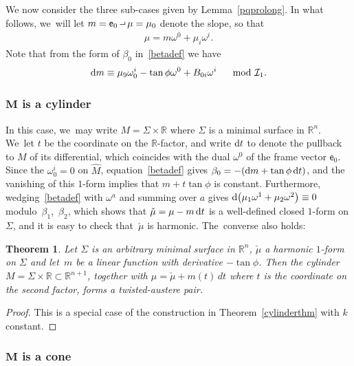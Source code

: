 \documentclass[pdftex]{sigma}
\def\R{\mathbb{R}}
\def\ve{\mathsf{e}}
\def\mudown{\check{\mu}}
\def\I{\mathcal{I}}
\def\w{\omega}
\def\Mhat{\widehat{M}}
\newcommand{\intprod}{\mathbin{\raisebox{.4ex}{\hbox{\vrule height .5pt width 5pt depth 0pt \vrule height 3pt width .5pt depth 0pt}}}}
\newtheorem{Theorem}{Theorem}[section]
\numberwithin{equation}{section}
\begin{document}
We now consider the three sub-cases given by Lemma~\ref{pqprolong}. In what follows, we~will let $m = \ve_0 \intprod \mu = \mu_0$ denote the slope, so that
\begin{gather*}
\mu = m \w^0 + \mu_i \w^i.
\end{gather*}
Note that from the form of $\beta_0$ in~\eqref{betadef} we have
\begin{gather*}
{\rm d}m \equiv \mu_9 \w^i_0 - \tan \phi \w^0 + B_{0i} \w^i \quad \mod \I_1.
\end{gather*}

\subsubsection[M is a cylinder]
{$\boldsymbol M$ is a cylinder} \label{splitcylindersec}

In this case, we~may write $M = \Sigma \times \R$ where $\Sigma$ is a minimal surface in $\R^n$. We~let $t$ be the coordinate on the $\R$-factor, and write ${\rm d}t$ to denote the pullback to $M$ of its differential, which coincides with the dual $\w^0$ of the frame vector $\ve_0$. Since the $\w^i_0=0$ on $\Mhat$, equation~\eqref{betadef} gives $\beta_0 = -({\rm d}m + \tan \phi\, {\rm d}t)$, and the vanishing of this $1$-form implies that $m+t \tan \phi $ is constant. Furthermore, wedging~\eqref{betadef} with $\w^a$ and summing over $a$ gives ${\rm d}\big(\mu_1 \w^1 + \mu_2 \w^2\big) \equiv 0$ modulo~$\beta_1$,~$\beta_2$, which shows that $\mudown = \mu - m\, {\rm d}t$ is a well-defined closed $1$-form on $\Sigma$, and it is easy to check that~$\mudown$ is harmonic. The~converse also holds:

\begin{Theorem} Let $\Sigma$ is an arbitrary minimal surface in $\R^n$, $\mudown$ a harmonic $1$-form on $\Sigma$ and let~$m$ be a linear function with derivative $-\tan\phi$. Then the cylinder $M = \Sigma \times \R \subset \R^{n+1}$, together with $\mu = \mudown + m(t) \,dt$ where $t$ is the coordinate on the second factor, forms a twisted-austere pair.
\end{Theorem}

\begin{proof} This is a special case of the construction in Theorem~\ref{cylinderthm} with $k$ constant.
\end{proof}

\subsubsection[M is a cone]
{$\boldsymbol M$ is a cone} \label{splitconesec}
\end{document}
